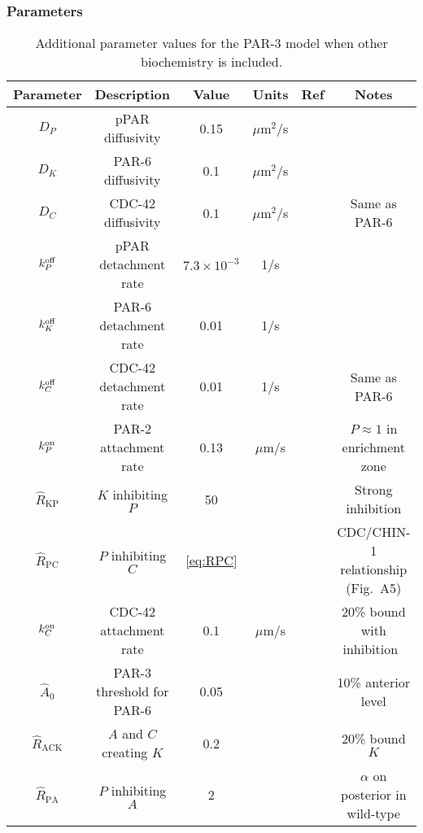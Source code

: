 \documentclass[11pt]{article}
\newcommand{\6}[1]{#1_{\text{6}}}
\newcommand{\3}[1]{#1_{\text{3}}}
\begin{document}
\subsubsection{Parameters \label{sec:param23}}
\begin{table}
\begin{small}
\centering
\begin{tabular}{|c|c|c|c|c|c|}\hline
Parameter & Description & Value & Units & Ref & Notes \\ \hline
$D_P$ & pPAR diffusivity & 0.15 & $\mu$m$^2$/s & \cite{goehring2011polarization}&  \\ 
$D_K$ & PAR-6 diffusivity & 0.1 & $\mu$m$^2$/s & \cite{robin2014single}&  \\ 
$D_C$ & CDC-42 diffusivity & 0.1 & $\mu$m$^2$/s && Same as PAR-6 \\ 
$k^\text{off}_P$ & pPAR detachment rate & $7.3 \times 10^{-3}$ & 1/s & \cite{goehring2011polarization}&  \\  
$k^\text{off}_K$ & PAR-6 detachment rate & 0.01 & 1/s & \cite{robin2014single}&  \\  
$k^\text{off}_C$ & CDC-42 detachment rate & 0.01 & 1/s & &  Same as PAR-6\\  \hline
$k^\text{on}_P$ & PAR-2 attachment rate & 0.13 & $\mu$m/s & \cite{gross2019guiding} & $P \approx 1$ in enrichment zone\\
$\hat{R}_\text{KP}$ & $K$ inhibiting $P$ &50  &  &  & Strong inhibition\\
$\hat R_\text{PC}$ & $P$ inhibiting $C$ & \eqref{eq:RPC}  & & \cite{sailer2015dynamic} & CDC/CHIN-1 relationship (Fig.\ A5)\\ 
$k^\text{on}_C$ & CDC-42 attachment rate & 0.1 & $\mu$m/s & & 20\% bound with inhibition\ \\ 
$\hat A_0$ & PAR-3 threshold for PAR-6 & 0.05&  & \cite{sailer2015dynamic}& 10\% anterior level \\
$\hat{R}_\text{ACK}$ & $A$ and $C$ creating $K$ & 0.2  &  &  & 20\% bound $K$\\
$\hat{R}_\text{PA}$ & $P$ inhibiting $A$ & 2  &  &  & $\alpha$ on posterior in wild-type\\ \hline
\end{tabular}
\caption{\label{tab:paramsBC}Additional parameter values for the PAR-3 model when other biochemistry is included.}
\end{small}
\end{table}
\end{document}

